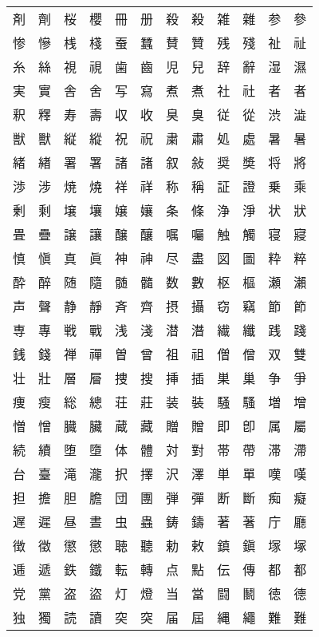\documentclass[11pt,a4j,titlepage]{jarticle}
\begin{document}
\begin{center}
\begin{tabular}{llllllllllll}
剤 & 劑 & 桜 & 櫻 & 冊 & 册 & 殺 & 殺 & 雑 & 雜 & 参 & 參\\
惨 & 慘 & 桟 & 棧 & 蚕 & 蠶 & 賛 & 贊 & 残 & 殘 & 祉 & 祉\\
糸 & 絲 & 視 & 視 & 歯 & 齒 & 児 & 兒 & 辞 & 辭 & 湿 & 濕\\
実 & 實 & 舎 & 舍 & 写 & 寫 & 煮 & 煮 & 社 & 社 & 者 & 者\\
釈 & 釋 & 寿 & 壽 & 収 & 收 & 臭 & 臭 & 従 & 從 & 渋 & 澁\\
獣 & 獸 & 縦 & 縱 & 祝 & 祝 & 粛 & 肅 & 処 & 處 & 暑 & 暑\\
緒 & 緖 & 署 & 署 & 諸 & 諸 & 叙 & 敍 & 奨 & 奬 & 将 & 將\\
渉 & 涉 & 焼 & 燒 & 祥 & 祥 & 称 & 稱 & 証 & 證 & 乗 & 乘\\
剰 & 剩 & 壌 & 壤 & 嬢 & 孃 & 条 & 條 & 浄 & 淨 & 状 & 狀\\
畳 & 疊 & 譲 & 讓 & 醸 & 釀 & 嘱 & 囑 & 触 & 觸 & 寝 & 寢\\
慎 & 愼 & 真 & 眞 & 神 & 神 & 尽 & 盡 & 図 & 圖 & 粋 & 粹\\
酔 & 醉 & 随 & 隨 & 髄 & 髓 & 数 & 數 & 枢 & 樞 & 瀬 & 瀨\\
声 & 聲 & 静 & 靜 & 斉 & 齊 & 摂 & 攝 & 窃 & 竊 & 節 & 節\\
専 & 專 & 戦 & 戰 & 浅 & 淺 & 潜 & 潛 & 繊 & 纖 & 践 & 踐\\
銭 & 錢 & 禅 & 禪 & 曽 & 曾 & 祖 & 祖 & 僧 & 僧 & 双 & 雙\\
壮 & 壯 & 層 & 層 & 捜 & 搜 & 挿 & 插 & 巣 & 巢 & 争 & 爭\\
痩 & 瘦 & 総 & 總 & 荘 & 莊 & 装 & 裝 & 騒 & 騷 & 増 & 增\\
憎 & 憎 & 臓 & 臟 & 蔵 & 藏 & 贈 & 贈 & 即 & 卽 & 属 & 屬\\
続 & 續 & 堕 & 墮 & 体 & 體 & 対 & 對 & 帯 & 帶 & 滞 & 滯\\
台 & 臺 & 滝 & 瀧 & 択 & 擇 & 沢 & 澤 & 単 & 單 & 嘆 & 嘆\\
担 & 擔 & 胆 & 膽 & 団 & 團 & 弾 & 彈 & 断 & 斷 & 痴 & 癡\\
遅 & 遲 & 昼 & 晝 & 虫 & 蟲 & 鋳 & 鑄 & 著 & 著 & 庁 & 廳\\
徴 & 徵 & 懲 & 懲 & 聴 & 聽 & 勅 & 敕 & 鎮 & 鎭 & 塚 & 塚\\
逓 & 遞 & 鉄 & 鐵 & 転 & 轉 & 点 & 點 & 伝 & 傳 & 都 & 都\\
党 & 黨 & 盗 & 盜 & 灯 & 燈 & 当 & 當 & 闘 & 鬭 & 徳 & 德\\
独 & 獨 & 読 & 讀 & 突 & 突 & 届 & 屆 & 縄 & 繩 & 難 & 難\\

\end{tabular}
\end{center}
\end{document}
